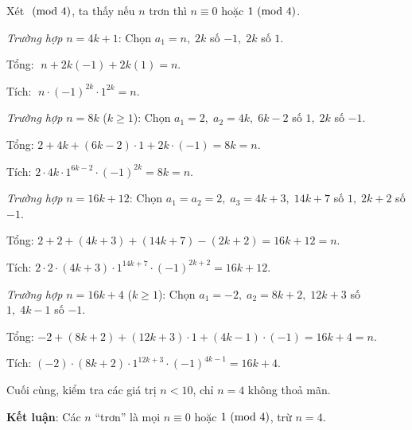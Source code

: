 \documentclass[../02-modular-arithmetic-b.tex]{subfiles}
\begin{document}
\bigbreak
\begin{soln}\footnotemark
    Xét \(\ (\mathrm{mod}\ 4)\), ta thấy nếu \( n \) trơn thì \( n \equiv 0\) hoặc \(1 \ (\mathrm{mod}\ 4)\).

    \textit{Trường hợp \( n = 4k + 1 \)}:
    Chọn \(a_1 = n,\; 2k\) số \(-1,\; 2k\) số \(1\).  

    Tổng: \(\;n + 2k(-1) + 2k(1) = n.\)  

    Tích: \(\;n \cdot (-1)^{2k} \cdot 1^{2k} = n.\)

    \textit{Trường hợp \( n = 8k \)} (\(k \ge 1\)):  
    Chọn \(a_1 = 2,\; a_2 = 4k,\; 6k-2\) số \(1,\; 2k\) số \(-1\).  

    Tổng: \(2 + 4k + (6k-2)\cdot 1 + 2k\cdot(-1) = 8k = n.\)  

    Tích: \(2 \cdot 4k \cdot 1^{6k-2} \cdot (-1)^{2k} = 8k = n.\)

    \textit{Trường hợp \( n = 16k + 12 \)}:  
    Chọn \(a_1 = a_2 = 2,\; a_3 = 4k + 3,\; 14k + 7\) số \(1,\; 2k + 2\) số \(-1\).  

    Tổng: \(2 + 2 + (4k+3) + (14k+7) - (2k+2) = 16k+12 = n.\)  

    Tích: \(2 \cdot 2 \cdot (4k+3) \cdot 1^{14k+7} \cdot (-1)^{2k+2} = 16k+12.\)

    \textit{Trường hợp \( n = 16k + 4 \)} (\(k \ge 1\)):  
    Chọn \(a_1 = -2,\; a_2 = 8k+2,\; 12k+3\) số \(1,\; 4k-1\) số \(-1\).  

    Tổng: \(-2 + (8k+2) + (12k+3)\cdot 1 + (4k-1)\cdot(-1) = 16k+4 = n.\)  
    
    Tích: \((-2) \cdot (8k+2) \cdot 1^{12k+3} \cdot (-1)^{4k-1} = 16k+4.\)

    Cuối cùng, kiểm tra các giá trị \(n<10\), chỉ \(n=4\) không thoả mãn.  

    \textbf{Kết luận}: Các \(n\) “trơn” là mọi \(n \equiv 0\) hoặc \(1 \ (\mathrm{mod}\ 4)\), trừ \(n=4\).
\end{soln}

\end{document}
